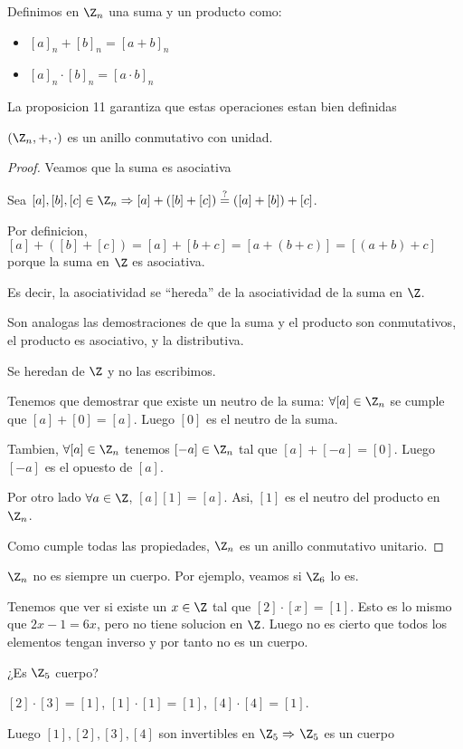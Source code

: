 \begin{definition}
	Definimos en \(\Z_n \) una suma y un producto como:
	\begin{itemize}
		\item \([a]_n + [b]_n = [a+b]_n\)
		\item \([a]_n \cdot [b]_n = [a \cdot b]_n \)
	\end{itemize}
	La proposicion 11 garantiza que estas operaciones estan bien definidas
\end{definition}
\begin{proposition}
	\((\Z_n, +, \cdot) \) es un anillo conmutativo con unidad.
\end{proposition}
\begin{proof}
	Veamos que la suma es asociativa

	Sea \([a], [b], [c] \in \Z_n \Rightarrow [a] + ([b] + [c]) \overset{?}{=} ([a] + [b]) + [c]\).

	Por definicion, \([a] + ([b] + [c]) = [a] + [b + c] = [a + (b + c )] = [(a+b) + c ]\) porque la suma en \(\Z \) es asociativa.

	Es decir, la asociatividad se ``hereda'' de la asociatividad de la suma en \(\Z \).

	Son analogas las demostraciones de que la suma y el producto son conmutativos, el producto es asociativo, y la distributiva.

	Se heredan de \(\Z \) y no las escribimos.

	Tenemos que demostrar que existe un neutro de la suma: \(\forall  [a] \in \Z_n \) se cumple que \([a] + [0] = [a ]\). Luego \([0 ]\) es el neutro de la suma.

	Tambien, \(\forall [a] \in \Z_n \) tenemos \([-a] \in \Z_n \) tal que \([a] + [-a] = [0 ]\). Luego \([-a ]\) es el opuesto de \([a ]\).

	Por otro lado \(\forall  a \in \Z \), \([a][1] = [a ]\). Asi,  \([1 ]\) es el neutro del producto en \(\Z_n \).

	Como cumple todas las propiedades, \(\Z_n \) es un anillo conmutativo unitario.
\end{proof}

\begin{example}
	\(\Z_n \) no es siempre un cuerpo. Por ejemplo, veamos si \(\Z_6 \) lo es.

	Tenemos que ver si existe un \(x \in  \Z \) tal que \([2] \cdot [x] = [1 ]\). Esto es lo mismo que \(2x - 1 = 6x \), pero no tiene solucion en \(\Z \). Luego no es cierto que todos los elementos tengan inverso y por tanto no es un cuerpo.

	¿Es \(\Z_5 \) cuerpo?

	\([2] \cdot [3] = [1]\), \([1] \cdot [1] = [1]\), \([4] \cdot [4] = [1]\).

	Luego \([1], [2], [3], [4]\) son invertibles en \(\Z_5 \Rightarrow\) \(\Z_5 \) es un cuerpo
\end{example}

